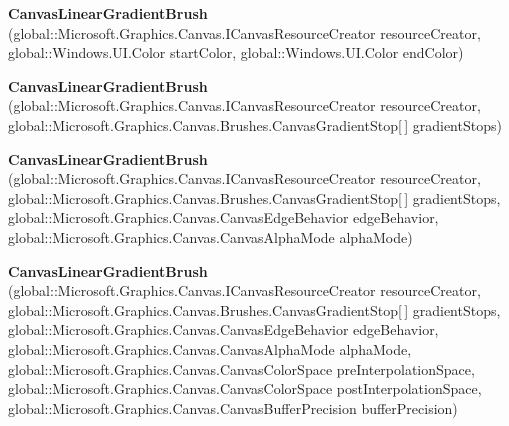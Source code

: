 \begin{DoxyCompactItemize}
\item 
\mbox{\label{class_microsoft_1_1_graphics_1_1_canvas_1_1_brushes_1_1_canvas_linear_gradient_brush_a4b33cfab37ecd3d6b6bef46dae48c88c}} 
{\bfseries Canvas\+Linear\+Gradient\+Brush} (global\+::\+Microsoft.\+Graphics.\+Canvas.\+I\+Canvas\+Resource\+Creator resource\+Creator, global\+::\+Windows.\+U\+I.\+Color start\+Color, global\+::\+Windows.\+U\+I.\+Color end\+Color)
\item 
\mbox{\label{class_microsoft_1_1_graphics_1_1_canvas_1_1_brushes_1_1_canvas_linear_gradient_brush_a60887ec32c82a971148a38aea74b62ea}} 
{\bfseries Canvas\+Linear\+Gradient\+Brush} (global\+::\+Microsoft.\+Graphics.\+Canvas.\+I\+Canvas\+Resource\+Creator resource\+Creator, global\+::\+Microsoft.\+Graphics.\+Canvas.\+Brushes.\+Canvas\+Gradient\+Stop\mbox{[}$\,$\mbox{]} gradient\+Stops)
\item 
\mbox{\label{class_microsoft_1_1_graphics_1_1_canvas_1_1_brushes_1_1_canvas_linear_gradient_brush_a84d29f89ab093f50d09215ddab09cbf1}} 
{\bfseries Canvas\+Linear\+Gradient\+Brush} (global\+::\+Microsoft.\+Graphics.\+Canvas.\+I\+Canvas\+Resource\+Creator resource\+Creator, global\+::\+Microsoft.\+Graphics.\+Canvas.\+Brushes.\+Canvas\+Gradient\+Stop\mbox{[}$\,$\mbox{]} gradient\+Stops, global\+::\+Microsoft.\+Graphics.\+Canvas.\+Canvas\+Edge\+Behavior edge\+Behavior, global\+::\+Microsoft.\+Graphics.\+Canvas.\+Canvas\+Alpha\+Mode alpha\+Mode)
\item 
\mbox{\label{class_microsoft_1_1_graphics_1_1_canvas_1_1_brushes_1_1_canvas_linear_gradient_brush_a5fbbd2cc60fa7f11f4ce627c5a243729}} 
{\bfseries Canvas\+Linear\+Gradient\+Brush} (global\+::\+Microsoft.\+Graphics.\+Canvas.\+I\+Canvas\+Resource\+Creator resource\+Creator, global\+::\+Microsoft.\+Graphics.\+Canvas.\+Brushes.\+Canvas\+Gradient\+Stop\mbox{[}$\,$\mbox{]} gradient\+Stops, global\+::\+Microsoft.\+Graphics.\+Canvas.\+Canvas\+Edge\+Behavior edge\+Behavior, global\+::\+Microsoft.\+Graphics.\+Canvas.\+Canvas\+Alpha\+Mode alpha\+Mode, global\+::\+Microsoft.\+Graphics.\+Canvas.\+Canvas\+Color\+Space pre\+Interpolation\+Space, global\+::\+Microsoft.\+Graphics.\+Canvas.\+Canvas\+Color\+Space post\+Interpolation\+Space, global\+::\+Microsoft.\+Graphics.\+Canvas.\+Canvas\+Buffer\+Precision buffer\+Precision)

\end{DoxyCompactItemize}
